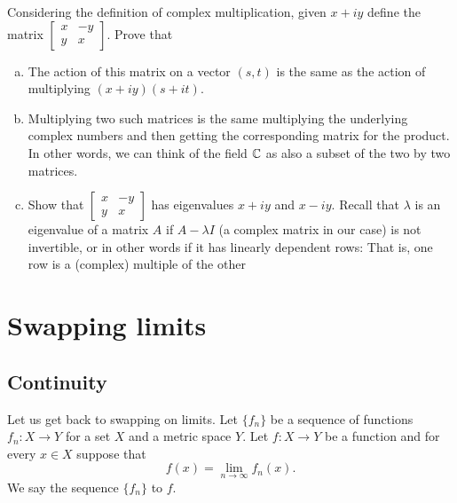 \begin{exercise}
Considering the definition of complex multiplication, given $x +iy$
define the matrix
$\left[ \begin{smallmatrix} x & -y \\ y & x \end{smallmatrix} \right]$.
Prove that
\begin{enumerate}[a)]
\item
The action of this matrix on a vector $(s,t)$ is the same
as the action of multiplying $(x+iy)(s+it)$.
\item
Multiplying two such matrices is the same multiplying the underlying complex
numbers and then getting the corresponding matrix for the product.
In other words, we can think of the field ${\mathbb{C}}$ as also a subset of
the two by two matrices.
\item
Show that 
$\left[ \begin{smallmatrix} x & -y \\ y & x \end{smallmatrix} \right]$
has eigenvalues $x+iy$ and $x-iy$.  Recall that $\lambda$ is
an eigenvalue of a matrix $A$ if $A-\lambda I$ (a complex matrix in our case)
is not invertible, or in other words
if it has linearly dependent rows: That is, one row is a (complex) multiple
of the other
\end{enumerate}
\end{exercise}



\sectionnewpage
\section{Swapping limits}
\label{sec:swaplim}


\subsection{Continuity}

Let us get back to swapping on limits.  Let $\{ f_n \}$ be a sequence
of functions $f_n \colon X \to Y$ for a set $X$ and a metric space $Y$.
Let $f \colon X \to Y$ be a
function and for every $x \in X$ suppose that
\begin{equation*}
f(x) = \lim_{n\to \infty} f_n(x) .
\end{equation*}
We say the sequence $\{ f_n \}$
\emph{} to $f$.

